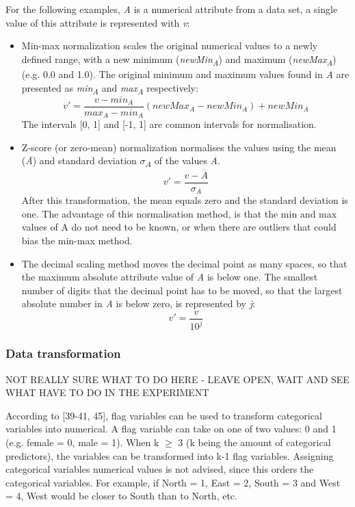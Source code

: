 For the following examples, \textit{A} is a numerical attribute from a data set, a single value of this attribute is represented with \textit{v}:
\begin{itemize}
  \item Min-max normalization scales the original numerical values to a newly defined range, with a new minimum (\textit{newMin\textsubscript{A}}) and maximum (\textit{newMax\textsubscript{A}}) (e.g. 0.0 and 1.0). The original minimum and maximum values found in \textit{A} are presented as \textit{min\textsubscript{A}} and \textit{max\textsubscript{A}} respectively:
  \[
    v' = \frac{v - min_A}{max_A - min_A}(newMax_A - newMin_A) + newMin_A
  \]
  The intervals [0, 1] and [-1, 1] are common intervals for normalisation. 

  \item Z-score (or zero-mean) normalization normalises the values using the mean (\textit{\={A}}) and standard deviation \textit{$\sigma$\textsubscript{A}} of the values \textit{A}.
  \[
    v' = \frac{v - \overline{A}}{\sigma_A}
  \]
  After this transformation, the mean equals zero and the standard deviation is one. The advantage of this normalisation method, is that the min and max values of A do not need to be known, or when there are outliers that could bias the min-max method.

  \item The decimal scaling method moves the decimal point as many spaces, so that the maximum absolute attribute value of \textit{A} is below one. The smallest number of digits that the decimal point has to be moved, so that the largest absolute number in \textit{A} is below zero, is represented by \textit{j}:
  \[
    v' = \frac{v}{10^j}
  \]
\end{itemize}



\subsubsection{Data transformation}
NOT REALLY SURE WHAT TO DO HERE - LEAVE OPEN, WAIT AND SEE WHAT HAVE TO DO IN THE EXPERIMENT

According to \textcite{DataMiningAndPredictiveAnalytics}[39-41, 45], flag variables can be used to transform categorical variables into numerical. A flag variable can take on one of two values: 0 and 1 (e.g. female = 0, male = 1). When k $\geq$ 3 (k being the amount of categorical predictors), the variables can be transformed into k-1 flag variables. Assigning categorical variables numerical values is not advised, since this orders the categorical variables. For example, if North = 1, East = 2, South = 3 and West = 4, West would be closer to South than to North, etc.


